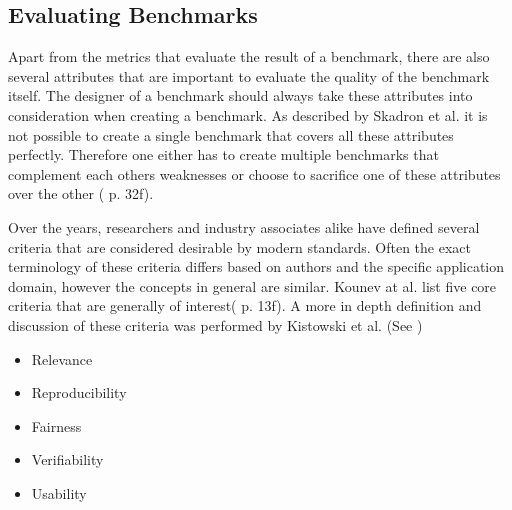 \documentclass[	runningheads,
				a4paper]{llncs}
\begin{document}
\subsection{Evaluating Benchmarks}
\label{ssec:eval_bm}
Apart from the metrics that evaluate the result of a benchmark, there are also several attributes that are important to evaluate the quality of the benchmark itself. The designer of a benchmark should always take these attributes into consideration when creating a benchmark. As described by Skadron et al. it is not possible to create a single benchmark that covers all these attributes perfectly. Therefore one either has to create multiple benchmarks that complement each others weaknesses or choose to sacrifice one of these attributes over the other (\cite{Skadron2003} p. 32f).

Over the years, researchers and industry associates alike have defined several criteria that are considered desirable by modern standards. Often the exact terminology of these criteria differs based on authors and the specific application domain, however the concepts in general are similar. Kounev at al. list five core criteria that are generally of interest(\cite{Kounev} p. 13f). A more in depth definition and discussion of these criteria was performed by Kistowski et al. (See \cite{kistowski2015})
\begin{itemize}
	\item Relevance
	\item Reproducibility
	\item Fairness
	\item Verifiability
	\item Usability
\end{itemize}
\end{document}
